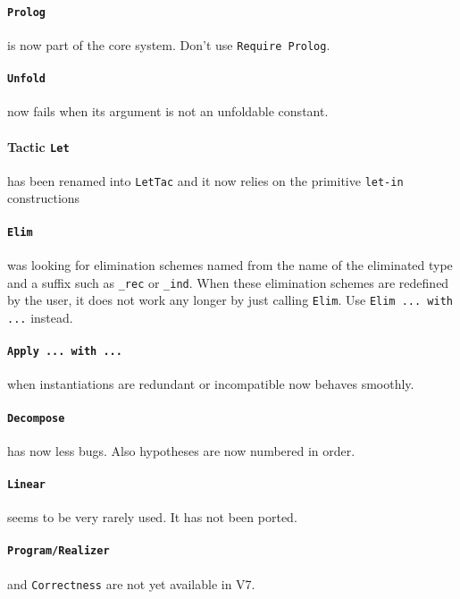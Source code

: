 \documentclass[11pt]{article}
\begin{document}
  \paragraph{{\tt Prolog}} is now part of the core
  system. Don't use {\tt Require Prolog}.

  \paragraph{{\tt Unfold}} now fails when its argument is not an
  unfoldable constant.

  \paragraph{Tactic {\tt Let}} has been renamed into {\tt LetTac}
  and it now relies on the primitive {\tt let-in} constructions

  \paragraph{{\tt Elim}} was looking for elimination schemes named
  from the name of the eliminated type and a suffix such as
  \verb:_rec: or \verb:_ind:. When these elimination schemes are
  redefined by the user, it does not work any longer by just calling
  {\tt Elim}. Use {\tt Elim ... with ...} instead.

  \paragraph{{\tt Apply ... with ...}} when instantiations are
  redundant or incompatible now behaves smoothly.

  \paragraph{{\tt Decompose}} has now less bugs. Also hypotheses
  are now numbered in order.

  \paragraph{{\tt Linear}} seems to be very rarely used. It has not
  been ported.

  \paragraph{{\tt Program/Realizer}} and {\tt Correctness} are not yet
  available in {\Coq} V7.
\end{document}
